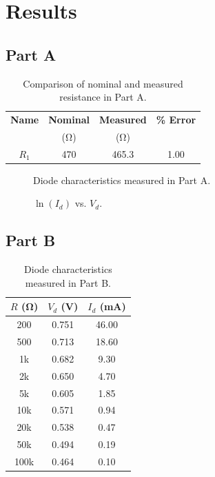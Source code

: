 \documentclass{article}
\begin{document}
\section{Results}
\label{sec:results}

\subsection{Part A}
\label{sec:result_a}

\begin{table}[hbtp]
  \centering
  \begin{tabular}{*{4}{c}}
    \textbf{Name} & \textbf{Nominal} & \textbf{Measured} & \textbf{\% Error} \\
    & (\si{\ohm}) & (\si{\ohm}) & \\
    \hline
    $R_1$ & 470 & 465.3 & 1.00 \\
  \end{tabular}
  \caption{\label{tab:percent_err} Comparison of nominal and measured resistance in Part A.}
\end{table}

\begin{figure}[hbtp]
  \centering
  
  \caption{\label{fig:part_a_graph} Diode characteristics measured in Part A.}
\end{figure}

\begin{figure}[hbtp]
  \centering
  
  \caption{\label{fig:part_a_graph2} $\ln{(I_d)}$ vs. $V_d$.}
\end{figure}

\subsection{Part B}
\label{sec:result_b}

\begin{table}[hbtp]
  \centering
  \begin{tabular}{ccc}
    $R$ (\si{\ohm}) & $V_d$ (\si{V}) & $I_d$ (\si{mA}) \\
    \hline
    200 & 0.751 & 46.00 \\
    500 & 0.713 & 18.60 \\
    1k & 0.682 & 9.30 \\
    2k & 0.650 & 4.70 \\
    5k & 0.605 & 1.85 \\
    10k & 0.571 & 0.94 \\
    20k & 0.538 & 0.47 \\
    50k & 0.494 & 0.19 \\
    100k & 0.464 & 0.10 \\
  \end{tabular}
  \caption{\label{tab:part_b} Diode characteristics measured in Part B.}
\end{table}
\end{document}
